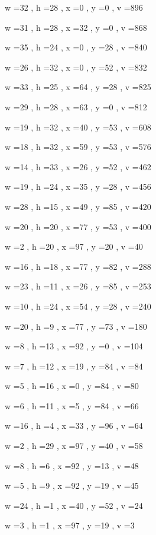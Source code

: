 \documentclass[11pt]{article}
\begin{document}
w =32 , h =28 , x =0 , y =0 , v =896
\par
w =31 , h =28 , x =32 , y =0 , v =868
\par
w =35 , h =24 , x =0 , y =28 , v =840
\par
w =26 , h =32 , x =0 , y =52 , v =832
\par
w =33 , h =25 , x =64 , y =28 , v =825
\par
w =29 , h =28 , x =63 , y =0 , v =812
\par
w =19 , h =32 , x =40 , y =53 , v =608
\par
w =18 , h =32 , x =59 , y =53 , v =576
\par
w =14 , h =33 , x =26 , y =52 , v =462
\par
w =19 , h =24 , x =35 , y =28 , v =456
\par
w =28 , h =15 , x =49 , y =85 , v =420
\par
w =20 , h =20 , x =77 , y =53 , v =400
\par
w =2 , h =20 , x =97 , y =20 , v =40
\par
w =16 , h =18 , x =77 , y =82 , v =288
\par
w =23 , h =11 , x =26 , y =85 , v =253
\par
w =10 , h =24 , x =54 , y =28 , v =240
\par
w =20 , h =9 , x =77 , y =73 , v =180
\par
w =8 , h =13 , x =92 , y =0 , v =104
\par
w =7 , h =12 , x =19 , y =84 , v =84
\par
w =5 , h =16 , x =0 , y =84 , v =80
\par
w =6 , h =11 , x =5 , y =84 , v =66
\par
w =16 , h =4 , x =33 , y =96 , v =64
\par
w =2 , h =29 , x =97 , y =40 , v =58
\par
w =8 , h =6 , x =92 , y =13 , v =48
\par
w =5 , h =9 , x =92 , y =19 , v =45
\par
w =24 , h =1 , x =40 , y =52 , v =24
\par
w =3 , h =1 , x =97 , y =19 , v =3
\par
\newpage
\end{document}
